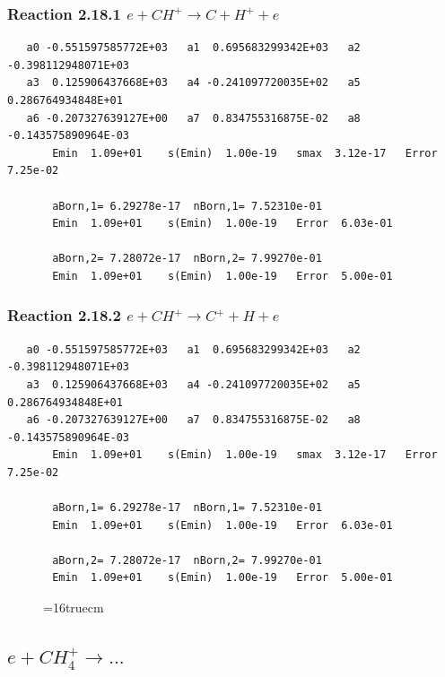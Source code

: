 \documentclass[12pt,dvipdfmx]{article}
\begin{document}
\subsubsection{
Reaction 2.18.1   $e + CH^+ \rightarrow C + H^+ + e $
}

\begin{small}\begin{verbatim}
   a0 -0.551597585772E+03   a1  0.695683299342E+03   a2 -0.398112948071E+03
   a3  0.125906437668E+03   a4 -0.241097720035E+02   a5  0.286764934848E+01
   a6 -0.207327639127E+00   a7  0.834755316875E-02   a8 -0.143575890964E-03
       Emin  1.09e+01    s(Emin)  1.00e-19   smax  3.12e-17   Error  7.25e-02

       aBorn,1= 6.29278e-17  nBorn,1= 7.52310e-01
       Emin  1.09e+01    s(Emin)  1.00e-19   Error  6.03e-01

       aBorn,2= 7.28072e-17  nBorn,2= 7.99270e-01
       Emin  1.09e+01    s(Emin)  1.00e-19   Error  5.00e-01
\end{verbatim}\end{small}

\subsubsection{
Reaction 2.18.2   $e + CH^+ \rightarrow C^+ + H + e $
}

\begin{small}\begin{verbatim}
   a0 -0.551597585772E+03   a1  0.695683299342E+03   a2 -0.398112948071E+03
   a3  0.125906437668E+03   a4 -0.241097720035E+02   a5  0.286764934848E+01
   a6 -0.207327639127E+00   a7  0.834755316875E-02   a8 -0.143575890964E-03
       Emin  1.09e+01    s(Emin)  1.00e-19   smax  3.12e-17   Error  7.25e-02

       aBorn,1= 6.29278e-17  nBorn,1= 7.52310e-01
       Emin  1.09e+01    s(Emin)  1.00e-19   Error  6.03e-01

       aBorn,2= 7.28072e-17  nBorn,2= 7.99270e-01
       Emin  1.09e+01    s(Emin)  1.00e-19   Error  5.00e-01
\end{verbatim}\end{small}

\begin{figure} \label{met.1_2.18}
\epsfxsize=16truecm
\end{figure}
\newpage

\subsection{
$e + CH_4^+ \rightarrow ...$
}
\end{document}
